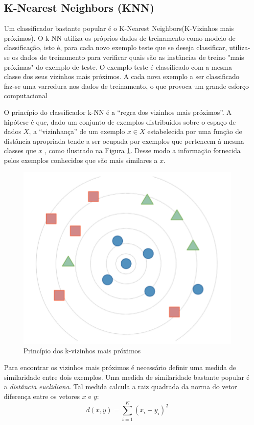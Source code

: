 \subsection{K-Nearest Neighbors (KNN)}
Um classificador bastante popular é o K-Nearest Neighbors(K-Vizinhos mais próximos). O k-NN utiliza os próprios dados de treinamento como modelo de classificação, isto é, para cada novo exemplo teste que se deseja classificar, utiliza-se os dados de treinamento para verificar  quais são as instâncias de treino "mais próximas" do exemplo de teste. O exemplo teste é classificado com a mesma classe dos seus vizinhos mais próximos. A cada nova exemplo a ser classificado faz-se uma varredura nos dados de treinamento, o que provoca um grande esforço computacional

O princípio do classificador k-NN é a ``regra dos vizinhos mais próximos''. A hipótese é que, dado um conjunto de exemplos distribuídos sobre o espaço de dados $X$, a ``vizinhança'' de um exemplo $x \in X$ estabelecida por uma função de distância apropriada tende a ser ocupada por exemplos que pertencem à mesma classes que $x$ \cite{hart1967} , como ilustrado na Figura \ref{fig-knn}. Desse modo a informação fornecida pelos exemplos conhecidos que são mais similares a $x$.

\begin{figure}[h]
	\centering
	\includegraphics[scale=0.5]{pasta1_figuras/knn.png}
	\caption{Princípio dos k-vizinhos mais próximos}
	\label{fig-knn}
\end{figure}

Para encontrar os vizinhos mais próximos é necessário definir uma medida de similaridade entre dois exemplos. Uma medida de similaridade bastante popular é a \textit{distância euclidiana}. Tal medida calcula a raiz quadrada da norma do vetor diferença entre os vetores $x$ e $y$:
\begin{equation} \label{eq_disteucli}
d(x,y)= \sum_{i=1}^{K} (x_i - y_i)^2
\end{equation}

